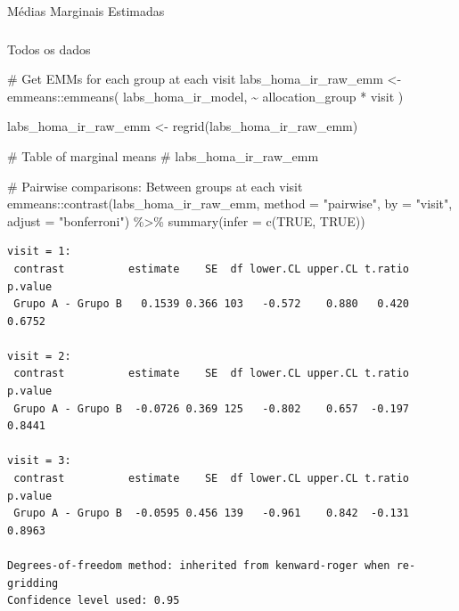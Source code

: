 \documentclass[
  12pt,
]{article}
\makeatletter
\let\oldparagraph\paragraph
\renewcommand{\paragraph}{
    \@ifstar
      \xxxParagraphStar
      \xxxParagraphNoStar
  }
\newcommand{\xxxParagraphStar}[1]{\oldparagraph*{#1}\mbox{}}
\newcommand{\xxxParagraphNoStar}[1]{\oldparagraph{#1}\mbox{}}
\let\oldsubparagraph\subparagraph
\renewcommand{\subparagraph}{
    \@ifstar
      \xxxSubParagraphStar
      \xxxSubParagraphNoStar
  }
\newcommand{\xxxSubParagraphStar}[1]{\oldsubparagraph*{#1}\mbox{}}
\newcommand{\xxxSubParagraphNoStar}[1]{\oldsubparagraph{#1}\mbox{}}
\newenvironment{Shaded}{\begin{snugshade}}{\end{snugshade}}
\newcommand{\AttributeTok}[1]{\textcolor[rgb]{0.40,0.45,0.13}{#1}}
\newcommand{\CommentTok}[1]{\textcolor[rgb]{0.37,0.37,0.37}{#1}}
\newcommand{\ConstantTok}[1]{\textcolor[rgb]{0.56,0.35,0.01}{#1}}
\newcommand{\FunctionTok}[1]{\textcolor[rgb]{0.28,0.35,0.67}{#1}}
\newcommand{\NormalTok}[1]{\textcolor[rgb]{0.00,0.23,0.31}{#1}}
\newcommand{\OtherTok}[1]{\textcolor[rgb]{0.00,0.23,0.31}{#1}}
\newcommand{\SpecialCharTok}[1]{\textcolor[rgb]{0.37,0.37,0.37}{#1}}
\newcommand{\StringTok}[1]{\textcolor[rgb]{0.13,0.47,0.30}{#1}}
\makeatother
\begin{document}
\paragraph{Médias Marginais
Estimadas}\label{muxe9dias-marginais-estimadas-11}

\subparagraph{Todos os dados}\label{todos-os-dados-11}

\begin{Shaded}
\begin{Highlighting}[]
\CommentTok{\# Get EMMs for each group at each visit}
\NormalTok{labs\_homa\_ir\_raw\_emm }\OtherTok{\textless{}{-}}\NormalTok{ emmeans}\SpecialCharTok{::}\FunctionTok{emmeans}\NormalTok{(}
\NormalTok{    labs\_homa\_ir\_model, }
    \SpecialCharTok{\textasciitilde{}}\NormalTok{ allocation\_group }\SpecialCharTok{*}\NormalTok{ visit}
\NormalTok{)}

\NormalTok{labs\_homa\_ir\_raw\_emm }\OtherTok{\textless{}{-}} \FunctionTok{regrid}\NormalTok{(labs\_homa\_ir\_raw\_emm)}

\CommentTok{\# Table of marginal means}
\CommentTok{\# labs\_homa\_ir\_raw\_emm}

\CommentTok{\# Pairwise comparisons: Between groups at each visit}
\NormalTok{emmeans}\SpecialCharTok{::}\FunctionTok{contrast}\NormalTok{(labs\_homa\_ir\_raw\_emm,}
\AttributeTok{method =} \StringTok{"pairwise"}\NormalTok{, }\AttributeTok{by =} \StringTok{"visit"}\NormalTok{,}
\AttributeTok{adjust =} \StringTok{"bonferroni"}\NormalTok{) }\SpecialCharTok{\%\textgreater{}\%} \FunctionTok{summary}\NormalTok{(}\AttributeTok{infer =} \FunctionTok{c}\NormalTok{(}\ConstantTok{TRUE}\NormalTok{, }\ConstantTok{TRUE}\NormalTok{))}
\end{Highlighting}
\end{Shaded}

\begin{verbatim}
visit = 1:
 contrast          estimate    SE  df lower.CL upper.CL t.ratio p.value
 Grupo A - Grupo B   0.1539 0.366 103   -0.572    0.880   0.420  0.6752

visit = 2:
 contrast          estimate    SE  df lower.CL upper.CL t.ratio p.value
 Grupo A - Grupo B  -0.0726 0.369 125   -0.802    0.657  -0.197  0.8441

visit = 3:
 contrast          estimate    SE  df lower.CL upper.CL t.ratio p.value
 Grupo A - Grupo B  -0.0595 0.456 139   -0.961    0.842  -0.131  0.8963

Degrees-of-freedom method: inherited from kenward-roger when re-gridding 
Confidence level used: 0.95 
\end{verbatim}
\end{document}
